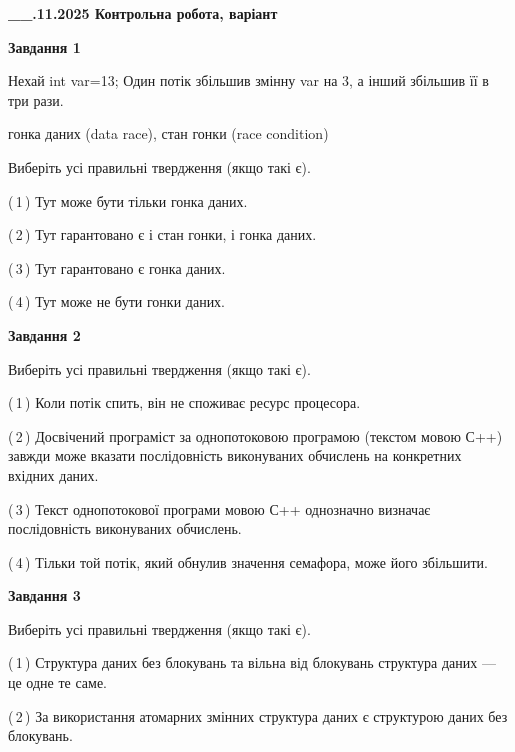 \documentclass[12pt, ukrainian]{article}
\begin{document}
\begin {large}

\textbf{\_\_.11.2025 Контрольна робота, варіант  }\par


{

\begin{center}
\textbf{Завдання 1}
\end{center}
Нехай int var=13; Один потік збільшив змінну var на 3, а інший збільшив її в три рази.

гонка даних (data race), стан гонки (race condition)

Виберіть усі правильні твердження (якщо такі є).\par
\vspace{2mm}
(\,1\,) Тут може бути тільки гонка даних.%

(\,2\,) Тут гарантовано є і стан гонки, і гонка даних.%

(\,3\,) Тут гарантовано є гонка даних.%

(\,4\,) Тут може не бути гонки даних.%



\begin{center}
\textbf{Завдання 2}
\end{center}
Виберіть усі правильні твердження (якщо такі є).\par
\vspace{2mm}

(\,1\,) Коли потік спить, він не споживає ресурс процесора.%

(\,2\,) Досвічений програміст за однопотоковою програмою (текстом мовою С++) завжди може вказати послідовність виконуваних обчислень на конкретних вхідних даних.%

(\,3\,) Текст однопотокової програми мовою С++ однозначно визначає послідовність виконуваних обчислень.%

(\,4\,) Тільки той потік, який обнулив значення семафора, може його збільшити.%



\begin{center}
\textbf{Завдання 3}
\end{center}
Виберіть усі правильні твердження (якщо такі є).\par
\vspace{2mm}

(\,1\,) Структура даних без блокувань та вільна від блокувань структура даних --- це одне те саме.%

(\,2\,) За використання атомарних змінних структура даних є структурою даних без блокувань.%

}
\end{large}
\end{document}

